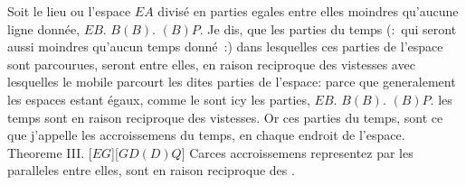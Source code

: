 \pstart%
\pend
\pstart
\noindent%
\protect{}\protect{}
\pend
\pstart 
\noindent%
Soit le lieu ou l'espace $\displaystyle EA$ divis\'{e} en parties egales entre elles moindres qu'aucune ligne donn\'{e}e,
$\displaystyle EB.$ $\displaystyle B(B).$ $\displaystyle (B)P$.
Je dis, que les parties du temps
(:~qui seront aussi moindres
\pend
\newpage
\pstart\noindent qu'aucun temps donn\'{e}~:)
dans lesquelles ces parties de l'espace sont parcourues,
seront entre elles, en raison reciproque des vistesses avec lesquelles le mobile parcourt les dites parties de l'espace:
parce que generalement les espaces estant \'{e}gaux,
comme le sont icy les parties,
$\displaystyle EB.$ $\displaystyle B(B).$ $\displaystyle (B)P.$
les temps sont en raison reciproque des vistesses.
Or ces parties du temps, sont ce que j'appelle les accroissemens du temps, en chaque endroit de l'espace.
\pend
\pstart%
Theoreme III.
\pend
\pstart
\noindent%
[$\displaystyle EG$][$\displaystyle GD(D)Q$]
\pend
\count{}
\pstart
\noindent%
Carces accroissemens representez par les
paralleles entre elles, sont en raison reciproque des
.
